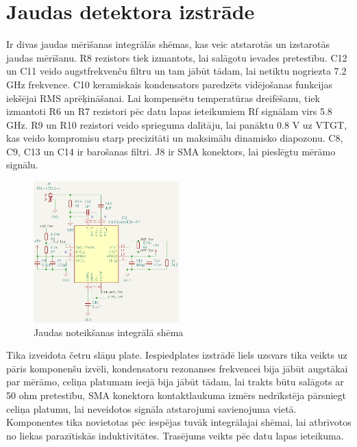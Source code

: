 \section{Jaudas detektora izstrāde}
Ir divas jaudas mērīšanas integrālās shēmas, kas veic atstarotās un izstarotās jaudas mērīšanu. R8 rezistors tiek izmantots, lai salāgotu ievades pretestību. C12 un C11 veido augstfrekvenču filtru un tam jābūt tādam, lai netiktu nogriezta 7.2 GHz frekvence. C10 keramiskais kondensators paredzēts vidējošanas funkcijas iekšējai RMS aprēķināšanai. Lai kompensētu temperatūras dreifēšanu, tiek izmantoti R6 un R7 rezistori pēc datu lapas ieteikumiem Rf signālam virs 5.8 GHz. R9 un R10 rezistori veido sprieguma dalītāju, lai panāktu 0.8 V uz VTGT, kas veido kompromisu starp precizitāti un maksimālu dinamisko diapozonu. C8, C9, C13 un C14 ir barošanas filtri. J8 ir SMA konektors, lai pieslēgtu mērāmo signālu.
\begin{figure}[H]
	\centering
    \includegraphics[width=0.5\textwidth]{pictures/fwd_powerdetector.png}\hspace{1cm}
    \caption{Jaudas noteikšanas integrālā shēma}
\end{figure}
Tika izveidota četru slāņu plate. Iespiedplates izstrādē liels uzsvars tika veikts uz pāris komponenšu izvēli, kondensatoru rezonanses frekvencei bija jābūt augstākai par mērāmo, celiņa platumam ieejā bija jābūt tādam, lai trakts būtu salāgots ar 50 ohm pretestību, SMA konektora kontaktlaukuma izmērs nedrīkstēja pārsniegt celiņa platumu, lai neveidotos signāla atstarojumi savienojuma vietā. Komponentes tika novietotas pēc iespējas tuvāk integrālajai shēmai, lai atbrīvotos no liekas parazītiskās induktivitātes. Trasējums veikts pēc datu lapas ieteikuma. 
